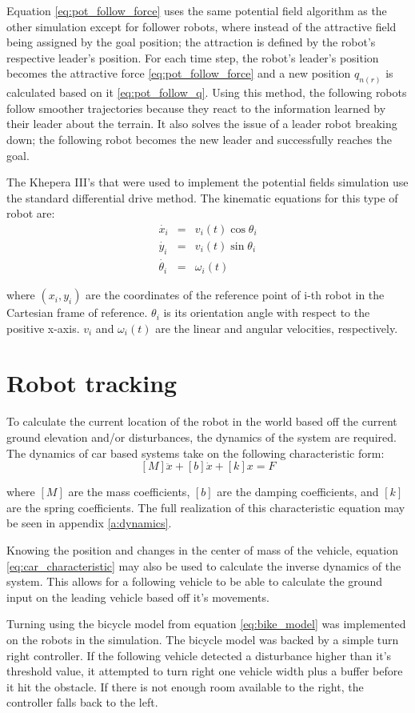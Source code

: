 Equation \eqref{eq:pot_follow_force} uses the same potential field algorithm as the other simulation except for follower robots, where instead of the attractive field being assigned by the goal position; the attraction is defined by the robot's respective leader's position. For each time step, the robot's leader's position becomes the attractive force \eqref{eq:pot_follow_force} and a new position $q_{n(r)}$ is calculated based on it \eqref{eq:pot_follow_q}. Using this method, the following robots follow smoother trajectories because they react to the information learned by their leader about the terrain. It also solves the issue of a leader robot breaking down; the following robot becomes the new leader and successfully reaches the goal.

The Khepera III's that were used to implement the potential fields simulation use the standard differential drive method. The kinematic equations for this type of robot are:
\begin{eqnarray} \label{eq:diff_drive}
	\dot{x_i} &=& v_i(t)\cos\theta_i\\
	\dot{y_i} &=& v_i(t)\sin\theta_i\\
	\dot{\theta_i} &=& \omega_i(t)
\end{eqnarray}

where $(x_i,y_i)$ are the coordinates of the reference point of i-th robot in the Cartesian frame of reference. $\theta_i$ is its orientation angle with respect to the positive x-axis. $v_i$ and $\omega_i(t)$ are the linear and angular velocities, respectively.

\section{Robot tracking}
To calculate the current location of the robot in the world based off the current ground elevation and/or disturbances, the dynamics of the system are required. The dynamics of car based systems take on the following characteristic form:
\begin{equation} \label{eq:car_characteristic}
[M]\ddot{x}+[b]\dot{x}+[k]x=F
\end{equation}

where $[M]$ are the mass coefficients, $[b]$ are the damping coefficients, and $[k]$ are the spring coefficients. The full realization of this characteristic equation may be seen in appendix \ref{a:dynamics}.

Knowing the position and changes in the center of mass of the vehicle, equation \eqref{eq:car_characteristic} may also be used to calculate the inverse dynamics of the system. This allows for a following vehicle to be able to calculate the ground input on the leading vehicle based off it's movements.

Turning using the bicycle model from equation \eqref{eq:bike_model} was implemented on the robots in the simulation. The bicycle model was backed by a simple turn right controller. If the following vehicle detected a disturbance higher than it's threshold value, it attempted to turn right one vehicle width plus a buffer before it hit the obstacle. If there is not enough room available to the right, the controller falls back to the left.

